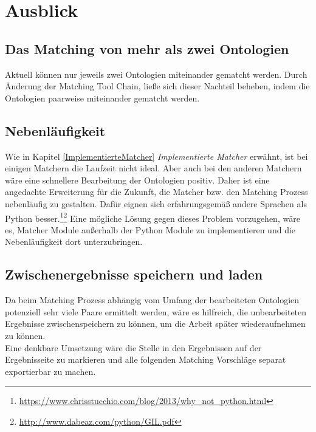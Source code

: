 %
\chapter{Ausblick}
\label{chap:outlook}      

\section{Das Matching von mehr als zwei Ontologien}
Aktuell können nur jeweils zwei Ontologien miteinander gematcht werden. Durch
Änderung der Matching Tool Chain, ließe sich dieser Nachteil beheben, indem die
Ontologien paarweise miteinander gematcht werden.

\section{Nebenläufigkeit}
Wie in Kapitel \ref{ImplementierteMatcher} \textit{Implementierte Matcher}
erwähnt, ist bei einigen Matchern die Laufzeit nicht ideal. Aber auch bei den anderen Matchern wäre eine schnellere
Bearbeitung der Ontologien positiv. Daher ist eine angedachte Erweiterung für
die Zukunft, die Matcher bzw.
den Matching Prozess nebenläufig zu gestalten. Dafür eignen sich erfahrungsgemäß
andere Sprachen als Python
besser.\footnote{\url{https://www.chrisstucchio.com/blog/2013/why_not_python.html}}\footnote{\url{http://www.dabeaz.com/python/GIL.pdf}}
Eine mögliche Lösung gegen dieses Problem vorzugehen, wäre es, Matcher Module
außerhalb der Python Module zu implementieren und die Nebenläufigkeit dort unterzubringen.

\section{Zwischenergebnisse speichern und laden}
Da beim Matching Prozess abhängig vom Umfang der bearbeiteten Ontologien
potenziell sehr viele Paare ermittelt werden, wäre es hilfreich, die
unbearbeiteten Ergebnisse zwischenspeichern zu können, um die Arbeit später
wiederaufnehmen zu können.\\
Eine denkbare Umsetzung wäre die Stelle in den Ergebnissen auf der
Ergebnisseite zu markieren und alle folgenden Matching Vorschläge separat
exportierbar zu machen.


